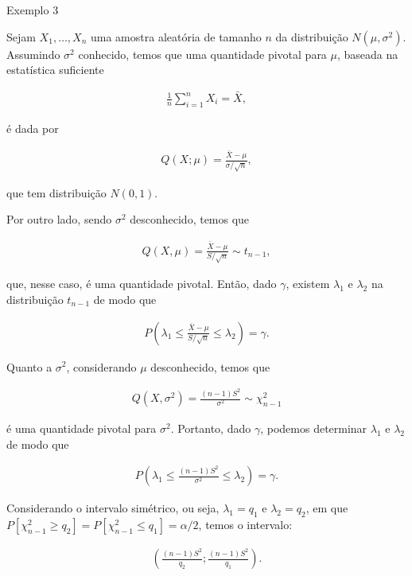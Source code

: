 \documentclass[12pt]{beamer}
\begin{document}
\begin{frame}{Exemplo 3}
\begin{block}{}
\justifying
Sejam $X_1, \ldots, X_n$ uma amostra aleatória de tamanho $n$ da distribuição $N(\mu, \sigma^2)$. Assumindo $\sigma^2$ conhecido, temos que uma quantidade pivotal para $\mu$, baseada na estatística suficiente

\begin{align*}
\frac{1}{n} \sum_{i=1}^{n} X_i = \bar{X},
\end{align*}

é dada por

\begin{align*}
Q(X; \mu) = \frac{\bar{X} - \mu}{\sigma/\sqrt{n}},
\end{align*}

que tem distribuição $N(0, 1)$.
\end{block}
\end{frame}

\begin{frame}{}
\begin{block}{}
\justifying
Por outro lado, sendo $\sigma^2$ desconhecido, temos que

\begin{align*}
Q(X, \mu) = \frac{\bar{X} - \mu}{S/\sqrt{n}} \sim t_{n-1},
\end{align*}

que, nesse caso, é uma quantidade pivotal. Então, dado $\gamma$, existem $\lambda_1$ e $\lambda_2$ na distribuição $t_{n-1}$ de modo que

\begin{align*}
P\left(\lambda_1 \leq \frac{\bar{X} - \mu}{S/\sqrt{n}} \leq \lambda_2\right) = \gamma.
\end{align*}
\end{block}
\end{frame}

\begin{frame}{}
\begin{block}{}
\justifying
Quanto a $\sigma^2$, considerando $\mu$ desconhecido, temos que

\begin{align*}
Q(X, \sigma^2) = \frac{(n - 1)S^2}{\sigma^2} \sim \chi^2_{n-1}
\end{align*}

é uma quantidade pivotal para $\sigma^2$. Portanto, dado $\gamma$, podemos determinar $\lambda_1$ e $\lambda_2$ de modo que

\begin{align*}
P\left(\lambda_1 \leq \frac{(n - 1)S^2}{\sigma^2} \leq \lambda_2\right) = \gamma.
\end{align*}

Considerando o intervalo simétrico, ou seja, $\lambda_1 = q_1$ e $\lambda_2 = q_2$, em que $P[\chi^2_{n-1} \geq q_2] = P[\chi^2_{n-1} \leq q_1] = \alpha/2$, temos o intervalo:

\begin{align*}
\left(\frac{(n - 1)S^2}{q_2}; \frac{(n - 1)S^2}{q_1}\right).
\end{align*}
\end{block}
\end{frame}
\end{document}
